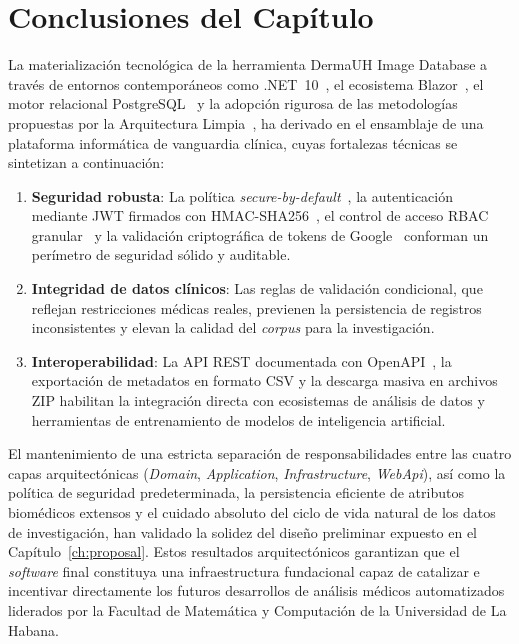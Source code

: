 \section{Conclusiones del Capítulo}
La materialización tecnológica de la herramienta DermaUH Image Database a través de entornos contemporáneos 
como .NET~10~\cite{aspnet_core_docs}, el ecosistema Blazor~\cite{blazor_docs}, el motor relacional 
PostgreSQL~\cite{postgresql_docs} y la adopción rigurosa de las metodologías propuestas por la 
Arquitectura Limpia~\cite{martin_clean_architecture}, ha derivado en el ensamblaje de una plataforma 
informática de vanguardia clínica, cuyas fortalezas técnicas se sintetizan a continuación:

\begin{enumerate}
    \item \textbf{Seguridad robusta}: La política \textit{secure-by-default}~\cite{owasp_secure_default}, 
    la autenticación mediante JWT firmados con HMAC-SHA256~\cite{rfc7519_jwt,rfc2104_hmac}, el control de 
    acceso RBAC granular~\cite{nist_rbac} y la validación criptográfica de tokens de 
    Google~\cite{rfc6749_oauth} conforman un perímetro de seguridad sólido y auditable.
    \item \textbf{Integridad de datos clínicos}: Las reglas de validación condicional, que reflejan 
    restricciones médicas reales, previenen la persistencia de registros inconsistentes y elevan la 
    calidad del \textit{corpus} para la investigación.
    \item \textbf{Interoperabilidad}: La API REST documentada con OpenAPI~\cite{openapi_spec}, la 
    exportación de metadatos en formato CSV y la descarga masiva en archivos ZIP habilitan la 
    integración directa con ecosistemas de análisis de datos y herramientas de entrenamiento de 
    modelos de inteligencia artificial.
\end{enumerate}

El mantenimiento de una estricta separación de responsabilidades entre las cuatro capas 
arquitectónicas (\textit{Domain}, \textit{Application}, \textit{Infrastructure}, \textit{WebApi}), 
así como la política de seguridad predeterminada, la persistencia eficiente de atributos biomédicos 
extensos y el cuidado absoluto del ciclo de vida natural de los datos de investigación, han validado 
la solidez del diseño preliminar expuesto en el Capítulo~\ref{ch:proposal}. Estos resultados arquitectónicos 
garantizan que el \textit{software} final constituya una infraestructura fundacional 
capaz de catalizar e incentivar directamente los futuros desarrollos de análisis médicos automatizados 
liderados por la Facultad de Matemática y Computación de la Universidad de La Habana.
